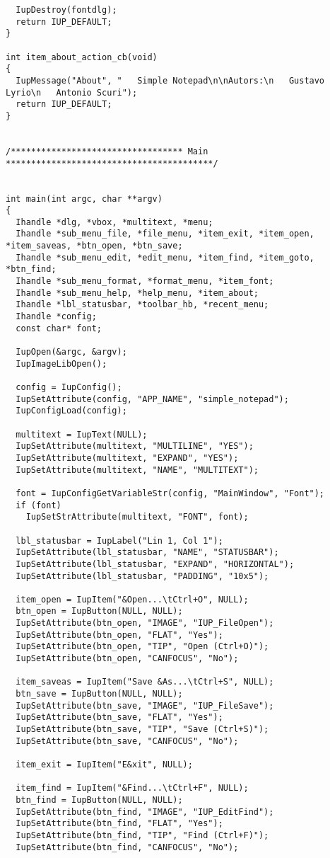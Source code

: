 \documentclass{ctexart}
\begin{document}
\begin{lstlisting}
  IupDestroy(fontdlg);
  return IUP_DEFAULT;
}

int item_about_action_cb(void)
{
  IupMessage("About", "   Simple Notepad\n\nAutors:\n   Gustavo Lyrio\n   Antonio Scuri");
  return IUP_DEFAULT;
}


/********************************** Main *****************************************/


int main(int argc, char **argv)
{
  Ihandle *dlg, *vbox, *multitext, *menu;
  Ihandle *sub_menu_file, *file_menu, *item_exit, *item_open, *item_saveas, *btn_open, *btn_save;
  Ihandle *sub_menu_edit, *edit_menu, *item_find, *item_goto, *btn_find;
  Ihandle *sub_menu_format, *format_menu, *item_font;
  Ihandle *sub_menu_help, *help_menu, *item_about;
  Ihandle *lbl_statusbar, *toolbar_hb, *recent_menu;
  Ihandle *config;
  const char* font;

  IupOpen(&argc, &argv);
  IupImageLibOpen();

  config = IupConfig();
  IupSetAttribute(config, "APP_NAME", "simple_notepad");
  IupConfigLoad(config);

  multitext = IupText(NULL);
  IupSetAttribute(multitext, "MULTILINE", "YES");
  IupSetAttribute(multitext, "EXPAND", "YES");
  IupSetAttribute(multitext, "NAME", "MULTITEXT");

  font = IupConfigGetVariableStr(config, "MainWindow", "Font");
  if (font)
    IupSetStrAttribute(multitext, "FONT", font);

  lbl_statusbar = IupLabel("Lin 1, Col 1");
  IupSetAttribute(lbl_statusbar, "NAME", "STATUSBAR");  
  IupSetAttribute(lbl_statusbar, "EXPAND", "HORIZONTAL");
  IupSetAttribute(lbl_statusbar, "PADDING", "10x5");

  item_open = IupItem("&Open...\tCtrl+O", NULL);
  btn_open = IupButton(NULL, NULL);
  IupSetAttribute(btn_open, "IMAGE", "IUP_FileOpen");
  IupSetAttribute(btn_open, "FLAT", "Yes");
  IupSetAttribute(btn_open, "TIP", "Open (Ctrl+O)");
  IupSetAttribute(btn_open, "CANFOCUS", "No");

  item_saveas = IupItem("Save &As...\tCtrl+S", NULL);
  btn_save = IupButton(NULL, NULL);
  IupSetAttribute(btn_save, "IMAGE", "IUP_FileSave");
  IupSetAttribute(btn_save, "FLAT", "Yes");
  IupSetAttribute(btn_save, "TIP", "Save (Ctrl+S)");
  IupSetAttribute(btn_save, "CANFOCUS", "No");

  item_exit = IupItem("E&xit", NULL);

  item_find = IupItem("&Find...\tCtrl+F", NULL);
  btn_find = IupButton(NULL, NULL);
  IupSetAttribute(btn_find, "IMAGE", "IUP_EditFind");
  IupSetAttribute(btn_find, "FLAT", "Yes");
  IupSetAttribute(btn_find, "TIP", "Find (Ctrl+F)");
  IupSetAttribute(btn_find, "CANFOCUS", "No");


\end{lstlisting}
\end{document}
